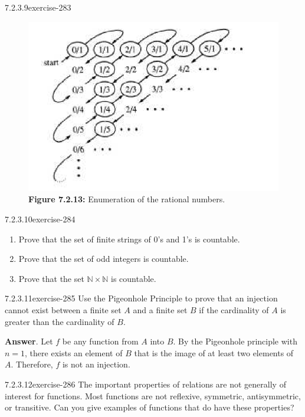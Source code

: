 \documentclass[twoside,10pt,]{book}
\numberwithin{equation}{section}
\begin{document}
\begin{divisionsolution}{7.2.3.9}{}{exercise-283}
\begin{figure}
\includegraphics[width=1\linewidth]{images/fig-sol-7-2-9.png}
\caption*{\textbf{Figure 7.2.13:} Enumeration of the rational numbers.}
\end{figure}
\end{divisionsolution}%
\begin{divisionsolution}{7.2.3.10}{}{exercise-284}%
\hypertarget{p-2398}{}%
\leavevmode%
\begin{enumerate}[label=(\alph*)]
\item\hypertarget{li-1238}{}\hypertarget{p-2399}{}%
Prove that the set of finite strings of 0's and 1's is countable.%
\item\hypertarget{li-1239}{}\hypertarget{p-2400}{}%
Prove that the set of odd integers is countable.%
\item\hypertarget{li-1240}{}\hypertarget{p-2401}{}%
Prove that the set  \(\mathbb{N}\times  \mathbb{N}\) is countable.%
\end{enumerate}
%
\end{divisionsolution}%
\begin{divisionsolution}{7.2.3.11}{}{exercise-285}%
\hypertarget{p-2402}{}%
Use the Pigeonhole Principle to prove that an injection cannot exist between a finite set \(A\) and a finite set \(B\) if the cardinality of \(A\) is greater than the cardinality of \(B\).%
\par\smallskip%
\noindent\textbf{Answer}.\quad%
\hypertarget{p-2403}{}%
Let \(f\) be any function from \(A\) into \(B\). By the Pigeonhole principle with \(n=1\), there exists an element of \(B\) that is the image of at least two elements of \(A\). Therefore, \(f\) is not an injection.%
\end{divisionsolution}%
\begin{divisionsolution}{7.2.3.12}{}{exercise-286}%
\hypertarget{p-2404}{}%
The important properties of relations are not generally of interest for functions. Most functions are not reflexive, symmetric, antisymmetric, or transitive. Can you give examples of functions that do have these properties?%
\end{divisionsolution}%
\end{document}
